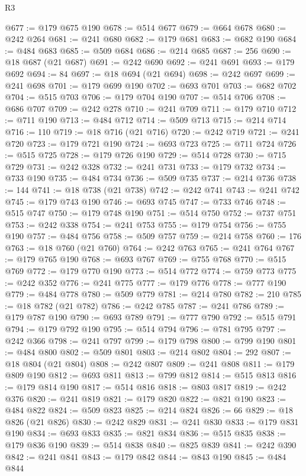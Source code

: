 \begin{lexlean}{R3}
\begin{coremodule}
@677 := @179 @675 @190
@678 := @514 @677
@679 := @664 @678
@680 := @242 @264
@681 := @241 @680
@682 := @179 @681
@683 := @682 @190
@684 := @484 @683
@685 := @509 @684
@686 := @214 @685
@687 := 256
@690 := @18 @687 (@21 @687)
@691 := @242 @690
@692 := @241 @691
@693 := @179 @692
@694 := 84
@697 := @18 @694 (@21 @694)
@698 := @242 @697
@699 := @241 @698
@701 := @179 @699 @190
@702 := @693 @701
@703 := @682 @702
@704 := @515 @703
@706 := @179 @704 @190
@707 := @514 @706
@708 := @686 @707
@709 := @242 @278
@710 := @241 @709
@711 := @179 @710
@712 := @711 @190
@713 := @484 @712
@714 := @509 @713
@715 := @214 @714
@716 := 110
@719 := @18 @716 (@21 @716)
@720 := @242 @719
@721 := @241 @720
@723 := @179 @721 @190
@724 := @693 @723
@725 := @711 @724
@726 := @515 @725
@728 := @179 @726 @190
@729 := @514 @728
@730 := @715 @729
@731 := @242 @328
@732 := @241 @731
@733 := @179 @732
@734 := @733 @190
@735 := @484 @734
@736 := @509 @735
@737 := @214 @736
@738 := 144
@741 := @18 @738 (@21 @738)
@742 := @242 @741
@743 := @241 @742
@745 := @179 @743 @190
@746 := @693 @745
@747 := @733 @746
@748 := @515 @747
@750 := @179 @748 @190
@751 := @514 @750
@752 := @737 @751
@753 := @242 @338
@754 := @241 @753
@755 := @179 @754
@756 := @755 @190
@757 := @484 @756
@758 := @509 @757
@759 := @214 @758
@760 := 176
@763 := @18 @760 (@21 @760)
@764 := @242 @763
@765 := @241 @764
@767 := @179 @765 @190
@768 := @693 @767
@769 := @755 @768
@770 := @515 @769
@772 := @179 @770 @190
@773 := @514 @772
@774 := @759 @773
@775 := @242 @352
@776 := @241 @775
@777 := @179 @776
@778 := @777 @190
@779 := @484 @778
@780 := @509 @779
@781 := @214 @780
@782 := 210
@785 := @18 @782 (@21 @782)
@786 := @242 @785
@787 := @241 @786
@789 := @179 @787 @190
@790 := @693 @789
@791 := @777 @790
@792 := @515 @791
@794 := @179 @792 @190
@795 := @514 @794
@796 := @781 @795
@797 := @242 @366
@798 := @241 @797
@799 := @179 @798
@800 := @799 @190
@801 := @484 @800
@802 := @509 @801
@803 := @214 @802
@804 := 292
@807 := @18 @804 (@21 @804)
@808 := @242 @807
@809 := @241 @808
@811 := @179 @809 @190
@812 := @693 @811
@813 := @799 @812
@814 := @515 @813
@816 := @179 @814 @190
@817 := @514 @816
@818 := @803 @817
@819 := @242 @376
@820 := @241 @819
@821 := @179 @820
@822 := @821 @190
@823 := @484 @822
@824 := @509 @823
@825 := @214 @824
@826 := 66
@829 := @18 @826 (@21 @826)
@830 := @242 @829
@831 := @241 @830
@833 := @179 @831 @190
@834 := @693 @833
@835 := @821 @834
@836 := @515 @835
@838 := @179 @836 @190
@839 := @514 @838
@840 := @825 @839
@841 := @242 @390
@842 := @241 @841
@843 := @179 @842
@844 := @843 @190
@845 := @484 @844

\end{coremodule}
\end{lexlean}
